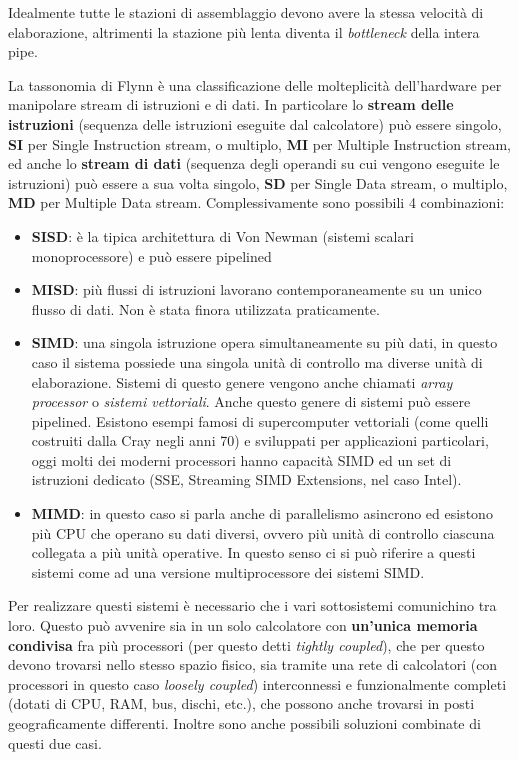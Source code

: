 \documentclass[italian,]{article}
\providecommand{\tightlist}{%
  \setlength{\itemsep}{0pt}\setlength{\parskip}{0pt}}
\begin{document}
Idealmente tutte le stazioni di assemblaggio devono avere la stessa
velocità di elaborazione, altrimenti la stazione più lenta diventa il
\emph{bottleneck} della intera pipe.

La tassonomia di Flynn è una classificazione delle molteplicità
dell'hardware per manipolare stream di istruzioni e di dati. In
particolare lo \textbf{stream delle istruzioni} (sequenza delle
istruzioni eseguite dal calcolatore) può essere singolo, \textbf{SI} per
Single Instruction stream, o multiplo, \textbf{MI} per Multiple
Instruction stream, ed anche lo \textbf{stream di dati} (sequenza degli
operandi su cui vengono eseguite le istruzioni) può essere a sua volta
singolo, \textbf{SD} per Single Data stream, o multiplo, \textbf{MD} per
Multiple Data stream. Complessivamente sono possibili 4 combinazioni:

\begin{itemize}
\tightlist
\item
  \textbf{SISD}: è la tipica architettura di Von Newman (sistemi scalari
  monoprocessore) e può essere pipelined
\item
  \textbf{MISD}: più flussi di istruzioni lavorano contemporaneamente su
  un unico flusso di dati. Non è stata finora utilizzata praticamente.
\item
  \textbf{SIMD}: una singola istruzione opera simultaneamente su più
  dati, in questo caso il sistema possiede una singola unità di
  controllo ma diverse unità di elaborazione. Sistemi di questo genere
  vengono anche chiamati \emph{array processor} o \emph{sistemi
  vettoriali}. Anche questo genere di sistemi può essere pipelined.
  Esistono esempi famosi di supercomputer vettoriali (come quelli
  costruiti dalla Cray negli anni 70) e sviluppati per applicazioni
  particolari, oggi molti dei moderni processori hanno capacità SIMD ed
  un set di istruzioni dedicato (SSE, Streaming SIMD Extensions, nel
  caso Intel).
\item
  \textbf{MIMD}: in questo caso si parla anche di parallelismo asincrono
  ed esistono più CPU che operano su dati diversi, ovvero più unità di
  controllo ciascuna collegata a più unità operative. In questo senso ci
  si può riferire a questi sistemi come ad una versione multiprocessore
  dei sistemi SIMD.
\end{itemize}

Per realizzare questi sistemi è necessario che i vari sottosistemi
comunichino tra loro. Questo può avvenire sia in un solo calcolatore con
\textbf{un'unica memoria condivisa} fra più processori (per questo detti
\emph{tightly coupled}), che per questo devono trovarsi nello stesso
spazio fisico, sia tramite una rete di calcolatori (con processori in
questo caso \emph{loosely coupled}) interconnessi e funzionalmente
completi (dotati di CPU, RAM, bus, dischi, etc.), che possono anche
trovarsi in posti geograficamente differenti. Inoltre sono anche
possibili soluzioni combinate di questi due casi.
\end{document}
